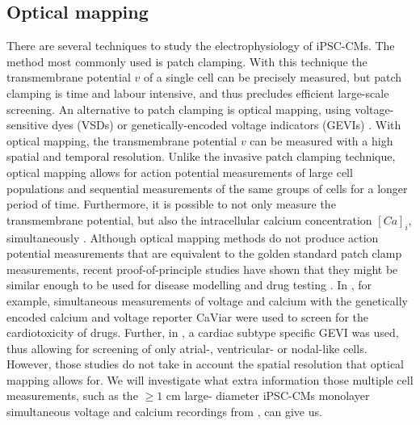 \documentclass{article}
\begin{document}
\subsection{Optical mapping}
There are several techniques to study the electrophysiology of iPSC-CMs. The method most commonly used is patch clamping. With this technique the transmembrane potential $v$ of a single cell can be precisely measured, but patch clamping is time and labour intensive, and thus precludes efficient large-scale screening. An alternative to patch clamping is optical mapping, using voltage-sensitive dyes (VSDs) or genetically-encoded voltage indicators (GEVIs) \cite{Denning2016}. With optical mapping, the transmembrane potential $v$ can be measured with a high spatial and temporal resolution. Unlike the invasive patch clamping technique, optical mapping allows for action potential measurements of large cell populations and sequential measurements of the same groups of cells for a longer period of time. Furthermore, it is possible to not only measure the transmembrane potential, but also the intracellular calcium concentration $[Ca]_i$, simultaneously \cite{Lee2012}. 
Although optical mapping methods do not produce action potential measurements that are equivalent to the golden standard patch clamp measurements, recent proof-of-principle studies have shown that they might be similar enough to be used for disease modelling and drug testing \cite{Shukla2017}. In \cite{Dempsey2016}, for example, simultaneous measurements of voltage and calcium with the genetically encoded calcium and voltage reporter CaViar were used to screen for the cardiotoxicity of drugs. Further, in \cite{Chen2016},
a cardiac subtype specific GEVI was used, thus allowing for screening of only atrial-, ventricular- or nodal-like cells. However, those studies do not take in account the spatial resolution that optical mapping allows for. We will investigate what extra information those multiple cell measurements, such as the $\ge1$ cm large- diameter iPSC-CMs monolayer simultaneous voltage and calcium recordings from \cite{Lee2012}, can give us.
%
\end{document}
